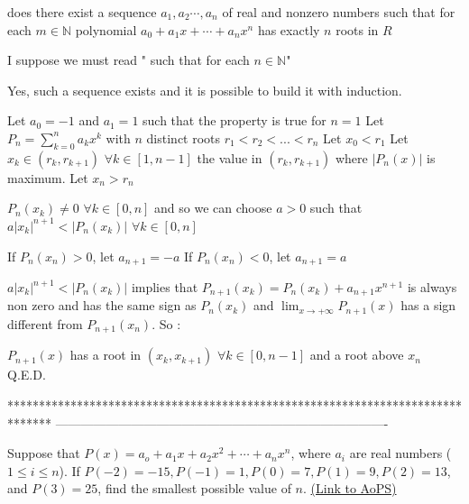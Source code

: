 \begin{solution}
	\begin{tcolorbox}does there exist a sequence $ a_{1},a_{2}\cdots ,a_{n}$ of real and nonzero numbers such that for each $ m\in\mathbb{N}$ polynomial $ a_{0} + a_{1}x + \cdots + a_{n}x^{n}$ has exactly $ n$ roots in $ R$\end{tcolorbox}

I suppose we must read " such that for each $ n\in\mathbb{N}$"

Yes, such a sequence exists and it is possible to build it with induction.

Let $ a_0=-1$ and $ a_1=1$ such that the property is true for $ n=1$
Let $ P_n=\sum_{k=0}^na_kx^k$ with $ n$ distinct roots $ r_1<r_2<...<r_n$
Let $ x_0<r_1$
Let $ x_k\in(r_k,r_{k+1})$ $ \forall k\in[1,n-1]$ the value in $ (r_k,r_{k+1})$ where $ |P_n(x)|$ is maximum.
Let $ x_n>r_n$

$ P_n(x_k)\ne 0$ $ \forall k\in[0,n]$ and so we can choose $ a>0$ such that $ a|x_k|^{n+1}<|P_n(x_k)|$ $ \forall k\in[0,n]$

If $ P_n(x_n)>0$, let $ a_{n+1}=-a$
If $ P_n(x_n)<0$, let $ a_{n+1}=a$

$ a|x_k|^{n+1}<|P_n(x_k)|$ implies that $ P_{n+1}(x_k)=P_n(x_k)+a_{n+1}x^{n+1}$ is always non zero and has the same sign as $ P_n(x_k)$
and $ \lim_{x\to+\infty}P_{n+1}(x)$ has a sign different from $ P_{n+1}(x_n)$. So :

$ P_{n+1}(x)$ has a root in $ (x_k,x_{k+1})$ $ \forall k\in[0,n-1]$ and a root above $ x_n$
Q.E.D.
\end{solution}
*******************************************************************************
-------------------------------------------------------------------------------

\begin{problem}
	Suppose that $ P(x)=a_o+a_1x+a_2x^2+\cdots+a_nx^n$, where $a_i$ are real numbers ($1 \leq i \leq n$). If $P(-2)=-15,P(-1)=1,P(0)=7,P(1)=9,P(2)=13$, and $P(3)=25$, find the smallest possible value of $n$.
	\flushright \href{https://artofproblemsolving.com/community/c6h343460}{(Link to AoPS)}
\end{problem}



